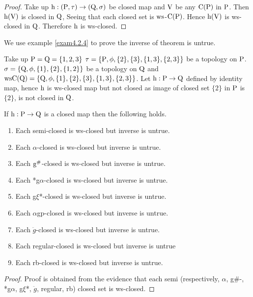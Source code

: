 \begin{proof}
Take up $\mathrm{h}: (\mathrm{P},\tau)\to (\mathrm{Q}, \sigma)$ be closed map and $\mathrm{V}$ be any $\mathrm{C}(\mathrm{P})$ in $\mathrm{P}$. Then $\mathrm{h}(\mathrm{V})$ is closed in $\mathrm{Q}$, Seeing that each closed set is $\mathrm{ws}$-$\mathrm{C}(\mathrm{P})$. Hence $\mathrm{h}(\mathrm{V})$ is ws-closed in $\mathrm{Q}$. Therefore $\mathrm{h}$ is ws-closed.
\end{proof}

We use example \ref{exam4.2.4} to prove the inverse of theorem is untrue.

\begin{exm}\label{exam4.2.4}
Take up $\mathrm{P} = \mathrm{Q} = \{1, 2, 3\}$ $\tau = \{\mathrm{P}, \phi, \{2\},\{3\},\{1,3\},\{2, 3\}\}$ be a topology on $\mathrm{P}$. $\sigma =\{\mathrm{Q}, \phi, \{1\},\{2\},\{1, 2\}\}$ be a topology on $\mathrm{Q}$ and $\mathrm{ws}\mathrm{C}(\mathrm{Q}) =\{\mathrm{Q}, \phi,\{1\}, \{2\},\{3\},\{1,3\},\{2,3\}\}$. Let $\mathrm{h}: \mathrm{P} \to \mathrm{Q}$ defined by identity map, hence $\mathrm{h}$ is ws-closed map but not closed as image of closed set $\{2\}$ in $\mathrm{P}$ is $\{2\}$, is not closed in $\mathrm{Q}$.
\end{exm}

\begin{thm}\label{thm4.2.5}
If $\mathrm{h}: \mathrm{P}\to \mathrm{Q}$ is a closed map then the following holds.
\begin{enumerate}[(1)]
\item Each semi-closed is ws-closed but inverse is untrue.
\item Each $\alpha$-closed is ws-closed but inverse is untrue.
\item Each $\mathrm{g}^{\#}$-closed is ws-closed but inverse is untrue.
\item Each *g$\alpha$-closed is ws-closed but inverse is untrue.
\item Each g$\xi$*-closed is ws-closed but inverse is untrue.
\item Each $\alpha$gp-closed is ws-closed but inverse is untrue.
\item Each $\ddot{g}$-closed is ws-closed but inverse is untrue.
\item Each regular-closed is ws-closed but inverse is untrue
\item Each rb-closed is ws-closed but inverse is untrue.
\end{enumerate}
\end{thm}

\begin{proof}
Proof is obtained from the evidence that each semi (respectively, $\alpha$, g\#-, *g$\alpha$, g$\xi$*, $\ddot{g}$, regular, rb) closed set is ws-closed.
\end{proof}

